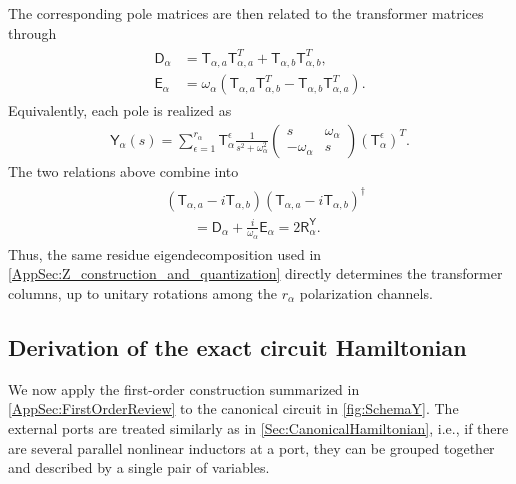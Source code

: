 \documentclass[prx,aps,twocolumn,article]{revtex4-2}
\newcommand{\msf}[1]{\mathsf{#1}}
\newcommand{\msT}{\msf{T}}
\newcommand{\msY}{\msf{Y}}
\newcommand{\msD}{\msf{D}}
\newcommand{\msE}{\msf{E}}
\newcommand{\msR}{\msf{R}}
\begin{document}
The corresponding pole matrices are then related to the transformer matrices through
\begin{align}
\begin{aligned}
    \msD_\alpha
    &=
    \msT_{\alpha,a}
    \msT_{\alpha,a}^T
    +
    \msT_{\alpha,b}
    \msT_{\alpha,b}^T,
    \\
    \msE_\alpha
    &=
    \omega_\alpha
    \left(
        \msT_{\alpha,a}
        \msT_{\alpha,b}^T
        -
        \msT_{\alpha,b}
        \msT_{\alpha,a}^T
    \right).
\end{aligned}
\label{Eq:NonReciprocalTransformerAdmittanceRelation}
\end{align}
Equivalently, each pole is realized as
\begin{align}
    \msY_\alpha(s)
    =
    \sum_{\epsilon=1}^{r_\alpha}
    \msT_\alpha^\epsilon
    \frac{1}{s^2+\omega_\alpha^2}
    \begin{pmatrix}
        s & \omega_\alpha\\
        -\omega_\alpha & s
    \end{pmatrix}
    \left(
        \msT_\alpha^\epsilon
    \right)^T.
    \label{Eq:YCanonicalPoleRealization}
\end{align}
The two relations above combine into
\begin{align}
\begin{aligned}
    &
    \left(
        \msT_{\alpha,a}
        -
        i\msT_{\alpha,b}
    \right)
    \left(
        \msT_{\alpha,a}
        -
        i\msT_{\alpha,b}
    \right)^\dag
    \\
    &\qquad=
    \msD_\alpha
    +
    \frac{i}{\omega_\alpha}
    \msE_\alpha
    =
    2\msR_\alpha^\msY.
\end{aligned}
\label{Eq:YTransformerResidueFactorization}
\end{align}
Thus, the same residue eigendecomposition used in
\cref{AppSec:Z_construction_and_quantization} directly determines
the transformer columns, up to unitary rotations among the
$r_\alpha$ polarization channels.

\subsection{Derivation of the exact circuit Hamiltonian}
\label{Sec:CanonicalHamiltonianY}
We now apply the first-order construction summarized in
\cref{AppSec:FirstOrderReview} to the canonical circuit in
\cref{fig:SchemaY}. The external ports are treated similarly as in \cref{Sec:CanonicalHamiltonian}, i.e., if there are several parallel nonlinear inductors at a port, they can be grouped together and described by a single pair of variables.
\end{document}
